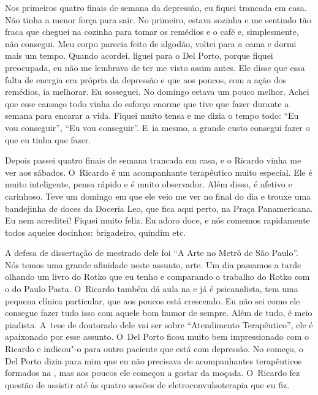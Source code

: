 Nos primeiros quatro finais de semana da depressão, eu fiquei trancada
em casa. Não tinha a menor força para sair. No primeiro, estava sozinha
e me sentindo tão fraca que cheguei na cozinha para tomar os remédios e
o café e, simplesmente, não consegui. Meu corpo parecia feito de
algodão, voltei para a cama e dormi mais um tempo. Quando acordei,
liguei para o Del Porto, porque fiquei preocupada, eu não me lembrava de
ter me visto assim antes. Ele disse que essa falta de energia era
própria da depressão e que aos poucos, com a ação dos remédios, ia
melhorar. Eu sosseguei. No domingo estava um pouco melhor. Achei que
esse cansaço todo vinha do esforço enorme que tive que fazer durante a
semana para encarar a vida. Fiquei muito tensa e me dizia o tempo todo:
``Eu vou conseguir'', ``Eu vou conseguir''. E~ia mesmo, a grande custo
consegui fazer o que eu tinha que fazer.

Depois passei quatro finais de semana trancada em casa, e o Ricardo
vinha me ver aos sábados. O~Ricardo é um acompanhante terapêutico muito
especial. Ele é muito inteligente, pensa rápido e é muito observador.
Além disso, é afetivo e carinhoso. Teve um domingo em que ele veio me
ver no final do dia e trouxe uma bandejinha de doces da Doceria Leo, que
fica aqui perto, na Praça Panamericana. Eu nem acreditei! Fiquei muito
feliz. Eu adoro doce, e nós comemos rapidamente todos aqueles docinhos:
brigadeiro, quindim etc.

A defesa de dissertação de mestrado dele foi ``A Arte no Metrô de São
Paulo''. Nós temos uma grande afinidade neste assunto, arte. Um dia
passamos a tarde olhando um livro do Rotko que eu tenho e comparando o
trabalho do Rotko com o do Paulo Pasta. O~Ricardo também dá aula na 
e já é psicanalista, tem uma pequena clínica particular, que aos poucos
está crescendo. Eu não sei como ele consegue fazer tudo isso com aquele
bom humor de sempre. Além de tudo, é meio piadista. A~tese de doutorado
dele vai ser sobre ``Atendimento Terapêutico'', ele é apaixonado por
esse assunto. O~Del Porto ficou muito bem impressionado com o Ricardo e
indicou"-o para outro paciente que está com depressão. No começo, o Del
Porto dizia para mim que eu não precisava de acompanhantes terapêuticos
formados na , mas aos poucos ele começou a gostar da moçada. O~Ricardo fez questão de assistir até às quatro sessões de
eletroconvulsoterapia que eu fiz.

